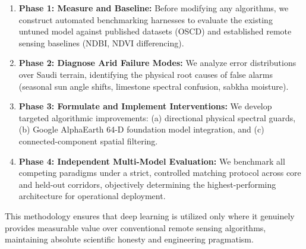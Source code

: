 \begin{enumerate}
    \item \textbf{Phase 1: Measure and Baseline:} Before modifying any algorithms, we construct automated benchmarking harnesses to evaluate the existing untuned model against published datasets (OSCD) and established remote sensing baselines (NDBI, NDVI differencing).
    \item \textbf{Phase 2: Diagnose Arid Failure Modes:} We analyze error distributions over Saudi terrain, identifying the physical root causes of false alarms (seasonal sun angle shifts, limestone spectral confusion, sabkha moisture).
    \item \textbf{Phase 3: Formulate and Implement Interventions:} We develop targeted algorithmic improvements: (a) directional physical spectral guards, (b) Google AlphaEarth 64-D foundation model integration, and (c) connected-component spatial filtering.
    \item \textbf{Phase 4: Independent Multi-Model Evaluation:} We benchmark all competing paradigms under a strict, controlled matching protocol across core and held-out corridors, objectively determining the highest-performing architecture for operational deployment.
\end{enumerate}

This methodology ensures that deep learning is utilized only where it genuinely provides measurable value over conventional remote sensing algorithms, maintaining absolute scientific honesty and engineering pragmatism.
\newpage
